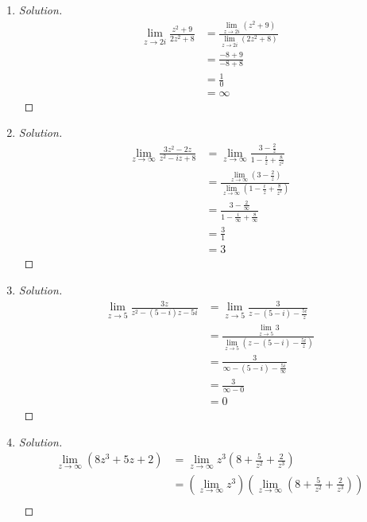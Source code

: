 \documentclass{article}
\begin{document}
\begin{enumerate}
	\item \begin{proof}[Solution]\let\qed\relax
			\begin{align*}
				\displaystyle\lim_{z\to 2i} \frac{z^2+9}{2z^2+8}
				&= \frac{\lim_{z\to 2i} (z^2 + 9)}{\lim_{z\to 2i}(2z^2 + 8)}\\
				&= \frac{-8 + 9}{-8+8}\\
				&= \frac{1}{0}\\
				&= \infty
			\end{align*}
		\end{proof}
	\item \begin{proof}[Solution]\let\qed\relax
			\begin{align*}
				\displaystyle\lim_{z\to \infty} \frac{3z^2-2z}{z^2-iz+8}
				&= \displaystyle\lim_{z\to \infty} \frac{3-\frac{2}{z}}{1-\frac{i}{z}+\frac{8}{z^2}}\\
				&= \frac{\lim_{z\to \infty} (3-\frac{2}{z})}{\lim_{z\to \infty}(1-\frac{i}{z}+\frac{8}{z^2})}\\
				&= \frac{3 - \frac{2}{\infty}}{1-\frac{i}{\infty}+\frac{8}{\infty}}\\
				&= \frac{3}{1}\\
				&= 3
			\end{align*}
		\end{proof}
	\item \begin{proof}[Solution]\let\qed\relax
			\begin{align*}
				\displaystyle\lim_{z\to 5} \frac{3z}{z^2-(5-i)z-5i}
				&= \displaystyle\lim_{z\to 5} \frac{3}{z-(5-i)-\frac{5i}{z}}\\
				&= \frac{\lim_{z\to 5} 3}{\lim_{z\to 5}(z-(5-i)-\frac{5i}{z})}\\
				&= \frac{3}{\infty - (5-i) - \frac{5i}{\infty}}\\
				&= \frac{3}{\infty - 0}\\
				&= 0
			\end{align*}
		\end{proof}
	\item \begin{proof}[Solution]\let\qed\relax
			\begin{align*}
				\displaystyle\lim_{z\to \infty} (8z^3 + 5z + 2)
				&= \displaystyle\lim_{z\to \infty} z^3(8 + \frac{5}{z^2} + \frac{2}{z^3})\\
				&= (\lim_{z\to \infty} z^3)(\lim_{z\to\infty}(8 + \frac{5}{z^2} + \frac{2}{z^3}))\\

\end{align*}
\end{proof}
\end{enumerate}
\end{document}
